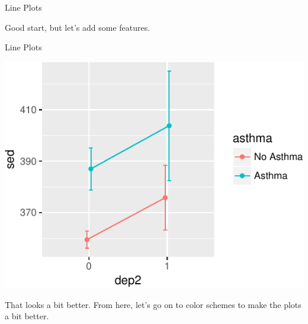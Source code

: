 \begin{frame}[fragile]{Line Plots}

Good start, but let's add some features.

\begin{Shaded}
\begin{Highlighting}[]
\StringTok{ }\NormalTok{(}\NormalTok{)}
\NormalTok{(}
                        \OperatorTok{+}
\StringTok{  }\NormalTok{(}\OperatorTok{+}
\StringTok{  }\NormalTok{(}\OperatorTok{+}
\StringTok{  }\NormalTok{(}\NormalTok{(}\OperatorTok{-}\StringTok{ }
                    \OperatorTok{+}\StringTok{ }
                \NormalTok{, }
\end{Highlighting}
\end{Shaded}

\end{frame}

\begin{frame}{Line Plots}

\includegraphics{09_AdvancedPlotting_files/figure-beamer/c9-1.pdf}

That looks a bit better. From here, let's go on to color schemes to make
the plots a bit better.

\end{frame}


